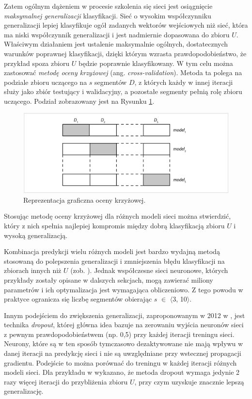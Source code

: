 Zatem ogólnym dążeniem w procesie szkolenia się sieci jest osiągnięcie \textit{maksymalnej generalizacji} klasyfikacji. Sieć o wysokim współczynniku generalizacji lepiej klasyfikuje ogół zadanych wektorów wejściowych niż sieć, która ma niski współczynnik generalizacji i jest nadmiernie dopasowana do zbioru $U$. Właściwym działaniem jest ustalenie maksymalnie ogólnych, dostatecznych warunków poprawnej klasyfikacji, dzięki którym wzrasta prawdopodobieństwo, że przykład spoza zbioru $U$ będzie poprawnie klasyfikowany. W tym celu można zastosować \textit{metodę oceny krzyżowej} (ang. \textit{cross-validation}). Metoda ta polega na podziale zbioru uczącego na $s$ segmentów $D$, z których każdy w innej iteracji służy jako zbiór testujący i walidacyjny, a pozostałe segmenty pełnią rolę zbioru uczącego. Podział zobrazowany jest na Rysunku \ref{cross-validation}.
\begin{figure}[h!]
	\centering
	\includegraphics[width=1\textwidth]{figures/cross-validation.png}
	\caption{Reprezentacja graficzna oceny krzyżowej.}
	\label{cross-validation}
\end{figure}
Stosując metodę oceny krzyżowej dla różnych modeli sieci można stwierdzić, który z nich spełnia najlepiej kompromis między dobrą klasyfikacją zbioru $U$ i wysoką generalizacją.

Kombinacja predykcji wielu różnych modeli jest bardzo wydajną metodą stosowaną do polepszenia generalizacji i zmniejszenia błędu klasyfikacji na zbiorach innych niż $U$ (zob. \cite{Bell2007, Breiman2001}). Jednak współczesne sieci neuronowe, których przykłady zostały opisane w dalszych sekcjach, mogą zawierać miliony parametrów i ich optymalizacja jest wymagająca obliczeniowo. Z tego powodu w praktyce ogranicza się liczbę segmentów obierając $s$ $\in$ $\langle$3, 10$\rangle$.

Innym podejściem do zwiększenia generalizacji, zaproponowanym w 2012 w \cite{DBLP:journals/corr/abs-1207-0580}, jest technika \textit{dropout}, której główna idea bazuje na zerowaniu wyjścia neuronów sieci z pewnym prawdopodobieństwem (np. 0,5) przy każdej iteracji treningu sieci. Neurony, które są w ten sposób tymczasowo dezaktywowane nie mają wpływu w danej iteracji na predykcję sieci i nie są uwzględniane przy wstecznej propagacji gradientu. Podejście to można porównać do treningu w każdej iteracji różnych modeli sieci. Dla przykładu w \cite{Krizhevsky2012} wykazano, że metoda dropout wymaga jedynie 2 razy więcej iteracji do przybliżenia zbioru $U$, przy czym uzyskuje znacznie lepszą generalizację. 

